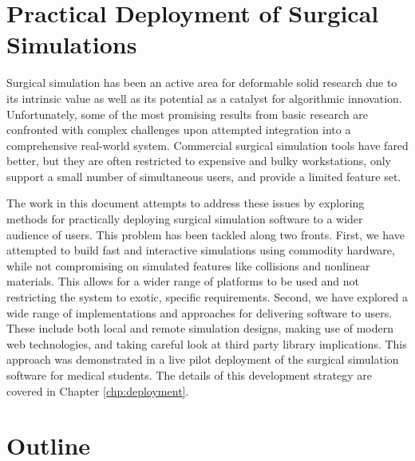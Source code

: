 \section{Practical Deployment of Surgical Simulations}

Surgical simulation has been an active area for deformable solid
research due to its intrinsic value as well as its potential as a
catalyst for algorithmic innovation. Unfortunately, some of the most
promising results from basic research are confronted with complex
challenges upon attempted integration into a comprehensive real-world
system. Commercial surgical simulation tools have fared better, but
they are often restricted to expensive and bulky workstations, only
support a small number of simultaneous users, and provide a limited
feature set.

The work in this document attempts to address these issues by
exploring methods for practically deploying surgical simulation
software to a wider audience of users. This problem has been tackled
along two fronts. First, we have attempted to build fast and
interactive simulations using commodity hardware, while not
compromising on simulated features like collisions and nonlinear
materials. This allows for a wider range of platforms to be used and
not restricting the system to exotic, specific requirements. Second,
we have explored a wide range of implementations and approaches for
delivering software to users. These include both local and remote
simulation designs, making use of modern web technologies, and taking
careful look at third party library implications. This approach was
demonstrated in a live pilot deployment of the surgical simulation
software for medical students. The details of this development
strategy are covered in Chapter \ref{chp:deployment}.

\section{Outline}

